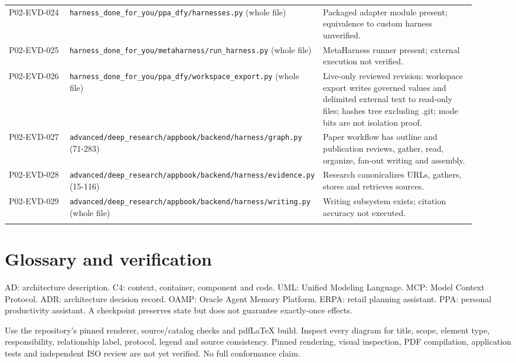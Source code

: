 \documentclass[10pt,letterpaper]{article}
\begin{document}
\begin{longtable}{@{}>{\raggedright\arraybackslash}p{0.16\linewidth}>{\raggedright\arraybackslash}p{0.34\linewidth}>{\raggedright\arraybackslash}p{0.42\linewidth}@{}}
P02-EVD-024 & \nolinkurl{harness_done_for_you/ppa_dfy/harnesses.py} (whole file) & Packaged adapter module present; equivalence to custom harness unverified.\\\addlinespace
P02-EVD-025 & \nolinkurl{harness_done_for_you/metaharness/run_harness.py} (whole file) & MetaHarness runner present; external execution not verified.\\\addlinespace
P02-EVD-026 & \nolinkurl{harness_done_for_you/ppa_dfy/workspace_export.py} (whole file) & Live-only reviewed revision: workspace export writes governed values and delimited external text to read-only files; hashes tree excluding .git; mode bits are not isolation proof.\\\addlinespace
P02-EVD-027 & \nolinkurl{advanced/deep_research/appbook/backend/harness/graph.py} (71-283) & Paper workflow has outline and publication reviews, gather, read, organize, fan-out writing and assembly.\\\addlinespace
P02-EVD-028 & \nolinkurl{advanced/deep_research/appbook/backend/harness/evidence.py} (15-116) & Research canonicalizes URLs, gathers, stores and retrieves sources.\\\addlinespace
P02-EVD-029 & \nolinkurl{advanced/deep_research/appbook/backend/harness/writing.py} (whole file) & Writing subsystem exists; citation accuracy not executed.\\\addlinespace
\bottomrule\end{longtable}

\section{Glossary and verification}
AD: architecture description. C4: context, container, component and code. UML: Unified Modeling Language. MCP: Model Context Protocol. ADR: architecture decision record. OAMP: Oracle Agent Memory Platform. ERPA: retail planning assistant. PPA: personal productivity assistant. A checkpoint preserves state but does not guarantee exactly-once effects.
\par
Use the repository's pinned renderer, source/catalog checks and pdfLaTeX build. Inspect every diagram for title, scope, element type, responsibility, relationship label, protocol, legend and source consistency. Pinned rendering, visual inspection, PDF compilation, application tests and independent ISO review are not yet verified. No full conformance claim.
\end{document}

